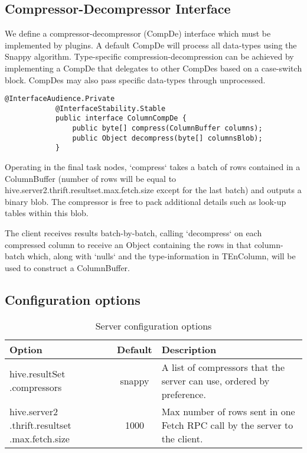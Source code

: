 \documentclass[11pt,a4paper]{article}
\begin{document}
	\subsection{Compressor-Decompressor Interface}
		We define a compressor-decompressor (CompDe) interface which must be implemented by plugins.
		A default CompDe will process all data-types using the Snappy algorithm.
		Type-specific compression-decompression can be achieved by implementing a CompDe that delegates to other CompDes based on a case-switch block.
		CompDes may also pass specific data-types through unprocessed.
		
		\begin{lstlisting}[title=org.apache.hive.service.cli.CompDe; CompDe.java,gobble=6,otherkeywords={ColumnBuffer,Object}]
			@InterfaceAudience.Private
			@InterfaceStability.Stable
			public interface ColumnCompDe {
				public byte[] compress(ColumnBuffer columns);
				public Object decompress(byte[] columnsBlob);
			}
		\end{lstlisting}
		
		Operating in the final task nodes, `compress` takes a batch of rows contained in a ColumnBuffer (number of rows will be equal to \linebreak hive.server2.thrift.resultset.max.fetch.size except for the last batch) and outputs a binary blob.
		The compressor is free to pack additional details such as look-up tables within this blob.
		
		The client receives results batch-by-batch, calling `decompress` on each compressed column to receive an Object containing the rows in that column-batch which, along with `nulls` and the type-information in TEnColumn, will be used to construct a ColumnBuffer.
		
	\subsection{Configuration options}
		\begin{table}[H]
			\begin{tabular}{| p{3cm} | c | p{6.5cm} |} \hline
				\textbf{Option} & \textbf{Default} & \textbf{Description} \\ \hline
				hive.resultSet\linebreak
				.compressors
				& snappy & A list of compressors that the server can use, ordered by preference.
				\\ \hline
				hive.server2\linebreak
				.thrift.resultset\linebreak
				.max.fetch.size
				& 1000 & Max number of rows sent in one Fetch RPC call by the server to the client.
				\\ \hline
			\end{tabular}
			\caption{Server configuration options}
		\end{table}
\end{document}
